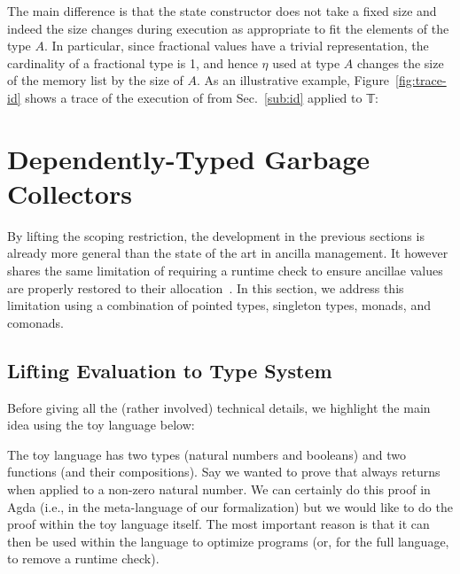\documentclass[sigplan,10pt,review,anonymous]{acmart}
\begin{document}
\PIFMEMstep{}

The main difference is that the state constructor does not take a
fixed size and indeed the size changes during execution as appropriate
to fit the elements of the type $A$. In particular, since fractional
values have a trivial representation, the cardinality of a fractional
type is 1, and hence $\eta$ used at type $A$ changes the size of the
memory list by the size of $A$. As an illustrative example,
Figure~\ref{fig:trace-id} shows a trace of the execution of 
from Sec.~\ref{sub:id} applied to 𝕋:

{\center}


\section{Dependently-Typed Garbage Collectors}
\label{sec:dep}

By lifting the scoping restriction, the development in the previous
sections is already more general than the state of the art in ancilla
management.  It however shares the same limitation of requiring a
runtime check to ensure ancillae values are properly restored to their
allocation~\cite{10.1007/978-3-319-20860-2_13,Green:2013:QSQ:2491956.2462177}.
In this section, we address this limitation using a combination of
pointed types, singleton types, monads, and comonads.

\subsection{Lifting Evaluation to Type System}

Before giving all the (rather involved) technical details, we
highlight the main idea using the toy language below:

\Jexample{}

The toy language has two types (natural numbers and booleans) and two
functions (and their compositions). Say we wanted to prove that
 always returns
 when applied to a non-zero natural
number. We can certainly do this proof in Agda (i.e., in the
meta-language of our formalization) but we would like to do the proof
within the toy language itself. The most important
reason is that it can then be used within the language to
optimize programs (or, for the full language, to
remove a runtime check).
\end{document}
